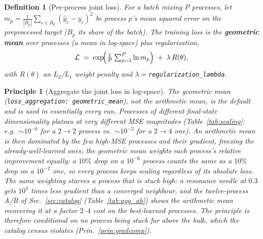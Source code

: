 \documentclass[11pt]{article}
\newcommand{\abs}[1]{\left\lvert #1 \right\rvert}
\newcommand{\Lloss}{\mathcal{L}}
\newcommand{\code}[1]{\texttt{#1}}
\newtheorem{definition}{Definition}
\newtheorem{principle}{Principle}
\begin{document}
\begin{definition}[Per-process joint loss]\label{def:loss}
For a batch mixing $P$ processes, let $m_p=\frac{1}{\abs{B_p}}\sum_{e\in B_p}(\hat y_e-y_e)^2$
be process $p$'s mean squared error on the preprocessed target ($B_p$ its share of the batch).
The training loss is the \textbf{geometric mean} over processes (a mean in log-space) plus
regularization,
\begin{equation}
  \Lloss \;=\; \exp\!\Bigl(\tfrac1P\textstyle\sum_{p=1}^{P}\ln m_p\Bigr)
   \;+\; \lambda\,R(\theta),
  \label{eq:loss}
\end{equation}
with $R(\theta)$ an $L_2$/$L_1$ weight penalty and $\lambda=$\code{regularization\_lambda}.
\end{definition}

\begin{principle}[Aggregate the joint loss in log-space]\label{prin:geomean}
The geometric mean (\code{loss\_aggregation: geometric\_mean}), not the arithmetic mean, is the
default and is used in essentially every run. Processes of different final-state dimensionality
plateau at very different MSE magnitudes (Table~\ref{tab:scaling}: e.g.\ $\sim\!10^{-6}$ for a
$2\!\to\!2$ process vs.\ $\sim\!10^{-2}$ for a $2\!\to\!4$ one). An arithmetic mean is then
dominated by the few high-MSE processes and their gradient, freezing the already-well-learned
ones; the geometric mean weights each process's \emph{relative} improvement equally: a $10\%$
drop on a $10^{-6}$ process counts the same as a $10\%$ drop on a $10^{-2}$ one, so every
process keeps scaling regardless of its absolute loss. The same weighting starves a process
that is stuck high: a resonance needle at $0.3$ gets $10^{4}$ times less gradient than a
converged neighbour, and the twelve-process A/B of Sec.~\ref{sec:catalog}
(Table~\ref{tab:agg_ab}) shows the arithmetic mean recovering it at a factor $2$--$4$ cost
on the best-learned processes. The principle is therefore conditional on no process being
stuck far above the bulk, which the catalog census violates (Prin.~\ref{prin:gradcomp}).
\end{principle}
\end{document}
